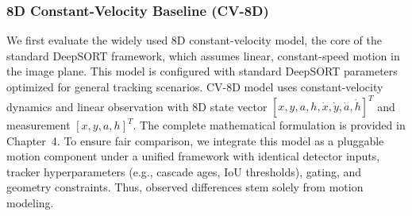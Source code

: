 \subsubsection{8D Constant-Velocity Baseline (CV-8D)}
We first evaluate the widely used 8D constant-velocity model, the core of the standard DeepSORT framework, which assumes linear, constant-speed motion in the image plane. This model is configured with standard DeepSORT parameters optimized for general tracking scenarios.
CV-8D model uses constant-velocity dynamics and linear observation with 8D state vector $[x, y, a, h, \dot{x}, \dot{y}, \dot{a}, \dot{h}]^T$ and measurement $[x, y, a, h]^T$. The complete mathematical formulation is provided in Chapter~4. To ensure fair comparison, we integrate this model as a pluggable motion component under a unified framework with identical detector inputs, tracker hyperparameters (e.g., cascade ages, IoU thresholds), gating, and geometry constraints. Thus, observed differences stem solely from motion modeling.

